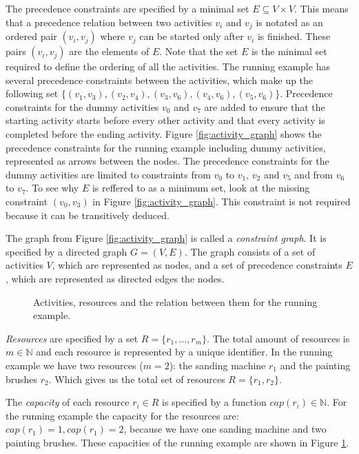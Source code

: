 \documentclass{article}
\theoremstyle{definition}
\newcommand{\inputtikz}[1]{}
\newcommand{\capa}[1]{\ensuremath{cap(r_{#1})}} %
\begin{document}
The precedence constraints are specified by a minimal set $E \subseteq V \times V$. 
This means that a precedence relation between two activities $v_i$ and $v_j$ is notated as an ordered pair $(v_i, v_j)$ where $v_j$ can be started only after $v_i$ is finished. 
These pairs $(v_i, v_j)$ are the elements of $E$.
Note that the set $E$ is the minimal set required to define the ordering of all the activities. 
The running example has several precedence constraints between the activities, which make up the following set $\{(v_1, v_3), (v_2, v_4), (v_3, v_6), (v_4, v_6), (v_5, v_6)\}$.
Precedence constraints for the dummy activities $v_0$ and $v_7$ are added to ensure that the starting activity starts before every other activity and that every activity is completed before the ending activity.
Figure \ref{fig:activity_graph} shows the precedence constraints for the running example including dummy activities, represented as arrows between the nodes.
The precedence constraints for the dummy activities are limited to constraints from $v_0$ to $v_1$, $v_2$ and $v_5$ and from $v_6$ to $v_7$. 
To see why $E$ is reffered to as a minimum set, look at the missing constraint $(v_0, v_3)$ in Figure \ref{fig:activity_graph}. 
This constraint is not required because it can be transitively deduced.

The graph from Figure \ref{fig:activity_graph} is called a \emph{constraint graph}. It is specified by a directed graph $G = (V, E)$.
The graph consists of a set of activities $V$, which are represented as nodes, and a set of precedence constraints $E$, which are represented as directed edges the nodes.

\begin{figure}[h]
	\centering
	\inputtikz{usage}
	\caption{Activities, resources and the relation between them for the running example.}
	\label{fig:resource_graph}
\end{figure}

\emph{Resources} are specified by a set $R = \{r_1, \ldots, r_m\}$.
The total amount of resources is $m \in \mathbb{N}$ and each resource is represented by a unique identifier. %
In the running example we have two resources ($m = 2$): the sanding machine $r_1$ and the painting brushes $r_2$.
Which gives us the total set of resources $R = \{r_1, r_2\}$.

The \emph{capacity} of each resource $r_i \in R$ is specified by a function $\capa{i} \in \mathbb{N}$.
For the running example the capacity for the resources are: $\capa{1} = 1, \capa{1} = 2$, because we have one sanding machine and two painting brushes.
These capacities of the running example are shown in Figure \ref{fig:resource_graph}.
\end{document}

